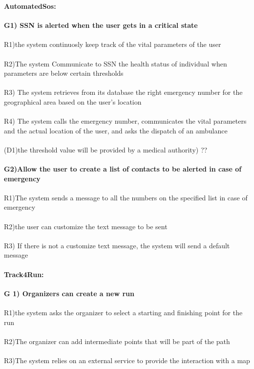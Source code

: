 \textbf{AutomatedSos:} \\ \\ 
\textbf{G1) SSN is alerted when the user gets in a critical state} \\ \\
R1)the system continuosly keep track of the vital parameters of the user \\ \\
R2)The system Communicate to SSN the health status of individual when parameters are below certain thresholds \\ \\
R3) The system retrieves from its database the right emergency number for the geographical area based on the user’s location \\ \\

R4) The system calls the emergency number, communicates the vital parameters and the actual location of the user, and asks the dispatch of an ambulance \\ \\

(D1)the threshold value will be provided by a medical authority) ?? \\ \\
\textbf{G2)Allow the user to create a list of contacts to be alerted  in case of emergency} \\ \\

R1)The system sends a message to all the numbers on the specified list in case of emergency \\ \\
R2)the user can customize the  text message to be sent \\ \\
R3) If there is not a customize text message, the system will send a default message \\ \\

\textbf{Track4Run:}\\ \\
\textbf{G 1) Organizers can create a new run} \\ \\
R1)the system asks the organizer to select a starting and finishing point for the run \\ \\
R2)The organizer can add intermediate points that will be part of the path \\ \\
R3)The system relies on an external service to provide the interaction with a map \\ \\

